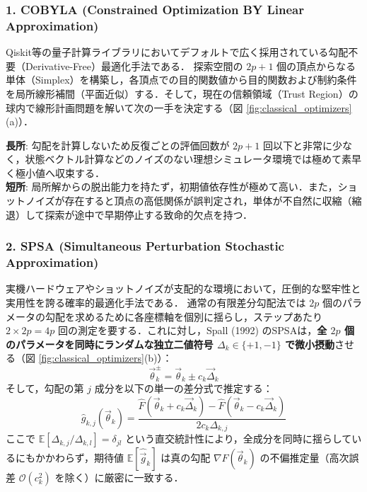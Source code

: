 \documentclass[11pt,a4paper,oneside,openany]{ltjsbook}
\theoremstyle{definition}
\theoremstyle{plain}
\theoremstyle{remark}
\begin{document}
\subsubsection*{1. COBYLA (Constrained Optimization BY Linear Approximation) \cite{powell1994direct}}
Qiskit等の量子計算ライブラリにおいてデフォルトで広く採用されている勾配不要（Derivative-Free）最適化手法である．
探索空間の $2p+1$ 個の頂点からなる単体（Simplex）を構築し，各頂点での目的関数値から目的関数および制約条件を局所線形補間（平面近似）する．そして，現在の信頼領域（Trust Region）の球内で線形計画問題を解いて次の一手を決定する（図 \ref{fig:classical_optimizers}(a)）．

\textbf{長所}: 勾配を計算しないため反復ごとの評価回数が $2p+1$ 回以下と非常に少なく，状態ベクトル計算などのノイズのない理想シミュレータ環境では極めて素早く極小値へ収束する．\\
\textbf{短所}: 局所解からの脱出能力を持たず，初期値依存性が極めて高い．また，ショットノイズが存在すると頂点の高低関係が誤判定され，単体が不自然に収縮（縮退）して探索が途中で早期停止する致命的欠点を持つ．

\subsubsection*{2. SPSA (Simultaneous Perturbation Stochastic Approximation) \cite{spall1992multivariate}}
実機ハードウェアやショットノイズが支配的な環境において，圧倒的な堅牢性と実用性を誇る確率的最適化手法である．
通常の有限差分勾配法では $2p$ 個のパラメータの勾配を求めるために各座標軸を個別に揺らし，ステップあたり $2 \times 2p = 4p$ 回の測定を要する．これに対し，Spall (1992) のSPSAは，\textbf{全 $2p$ 個のパラメータを同時にランダムな独立二値符号 $\Delta_k \in \{+1, -1\}$ で微小摂動}させる（図 \ref{fig:classical_optimizers}(b)）：
\begin{equation}
    \vec{\theta}_k^\pm = \vec{\theta}_k \pm c_k \vec{\Delta}_k
\end{equation}
そして，勾配の第 $j$ 成分を以下の単一の差分式で推定する：
\begin{equation}
    \hat{g}_{k, j}(\vec{\theta}_k) = \frac{\hat{F}(\vec{\theta}_k + c_k \vec{\Delta}_k) - \hat{F}(\vec{\theta}_k - c_k \vec{\Delta}_k)}{2 c_k \Delta_{k, j}}
\end{equation}
ここで $\mathbb{E}[\Delta_{k, j} / \Delta_{k, l}] = \delta_{jl}$ という直交統計性により，全成分を同時に揺らしているにもかかわらず，期待値 $\mathbb{E}[\hat{\vec{g}}_k]$ は真の勾配 $\nabla F(\vec{\theta}_k)$ の不偏推定量（高次誤差 $\mathcal{O}(c_k^2)$ を除く）に厳密に一致する．
\end{document}
